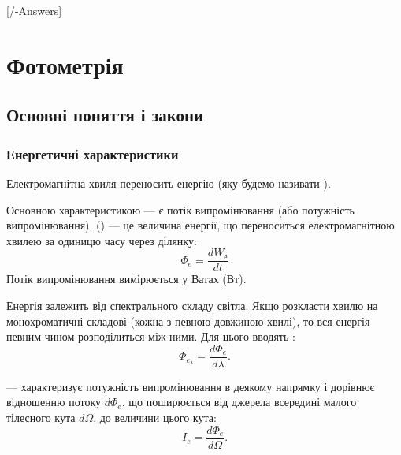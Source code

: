 
[\currfilebase/\currfilebase-Answers]
\chapter{Фотометрія}\label{\currfilebase}
\makeatletter
{}
\makeatother


\section{Основні поняття і закони}

\subsection*{Енергетичні характеристики}

Електромагнітна хвиля переносить енергію (яку будемо називати ).

Основною характеристикою --- є потік випромінювання (або потужність випромінювання).  (\hypertarget{Flux}{}) --- це величина енергії, що переноситься електромагнітною хвилею за одиницю часу через ділянку:
\begin{equation}\label{eq:Flux_e}
	\Phi_e = \frac{dW_\text{е}}{dt}
\end{equation}
Потік випромінювання вимірюється у Ватах (Вт).

Енергія залежить від спектрального складу світла. Якщо розкласти хвилю на монохроматичні складові (кожна з певною довжиною хвилі), то вся енергія певним чином розподілиться між ними. Для цього вводять :
\begin{equation}\label{eq:Flux_e_lambda}
	\Phi_{e_{\lambda}} = \frac{d\Phi_e}{d\lambda}.
\end{equation}

\hypertarget{Radiant_intensity}{} --- характеризує потужність випромінювання в деякому напрямку і дорівнює відношенню потоку $d\Phi_e$, що поширюється від джерела всередині малого тілесного кута $d\Omega$, до величини цього кута:
\begin{equation}\label{eq:Radiant_intensity}
	I_e = \frac{d\Phi_e}{d\Omega}.
\end{equation}

